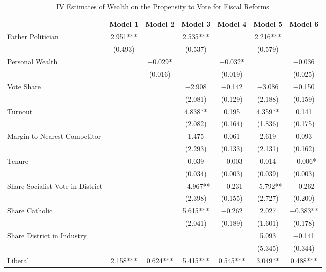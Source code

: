\begin{table}

\caption{\label{tab:ivresults_fisc_other_classific}IV Estimates of Wealth on the Propensity to Vote for Fiscal Reforms}
\centering
\begin{tabular}[t]{lcccccc}
\toprule
  & Model 1 & Model 2 & Model 3 & Model 4 & Model 5 & Model 6\\
\midrule
Father Politician & \num{2.951}*** &  & \num{2.535}*** &  & \num{2.216}*** & \\
 & (\num{0.493}) &  & (\num{0.537}) &  & (\num{0.579}) & \\
Personal Wealth &  & \num{-0.029}* &  & \num{-0.032}* &  & \num{-0.036}\\
 &  & (\num{0.016}) &  & (\num{0.019}) &  & (\num{0.025})\\
Vote Share &  &  & \num{-2.908} & \num{-0.142} & \num{-3.086} & \num{-0.150}\\
 &  &  & (\num{2.081}) & (\num{0.129}) & (\num{2.188}) & (\num{0.159})\\
Turnout &  &  & \num{4.838}** & \num{0.195} & \num{4.359}** & \num{0.141}\\
 &  &  & (\num{2.082}) & (\num{0.164}) & (\num{1.836}) & (\num{0.175})\\
Margin to Nearest Competitor &  &  & \num{1.475} & \num{0.061} & \num{2.619} & \num{0.093}\\
 &  &  & (\num{2.293}) & (\num{0.133}) & (\num{2.131}) & (\num{0.162})\\
Tenure &  &  & \num{0.039} & \num{-0.003} & \num{0.014} & \num{-0.006}*\\
 &  &  & (\num{0.034}) & (\num{0.003}) & (\num{0.039}) & (\num{0.003})\\
Share Socialist Vote in District &  &  & \num{-4.967}** & \num{-0.231} & \num{-5.792}** & \num{-0.262}\\
 &  &  & (\num{2.398}) & (\num{0.155}) & (\num{2.727}) & (\num{0.200})\\
Share Catholic &  &  & \num{5.615}*** & \num{-0.262} & \num{2.027} & \num{-0.383}**\\
 &  &  & (\num{2.041}) & (\num{0.189}) & (\num{1.601}) & (\num{0.178})\\
Share District in Industry &  &  &  &  & \num{5.093} & \num{-0.141}\\
 &  &  &  &  & (\num{5.345}) & (\num{0.344})\\
Liberal & \num{2.158}*** & \num{0.624}*** & \num{5.415}*** & \num{0.545}*** & \num{3.049}** & \num{0.488}***\\

\end{tabular}
\end{table}
